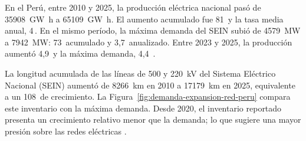 \documentclass[11pt,a4paper,oneside]{report}
\newcommand{\pct}{\mbox{\char37}}
\begin{document}
En el Perú, entre 2010 y 2025, la producción eléctrica nacional pasó de \SI{35908}{\giga\watt\hour} a \SI{65109}{\giga\watt\hour}. El aumento acumulado fue 81\,\pct{} y la tasa media anual, 4\,\pct{}. En el mismo período, la máxima demanda del SEIN subió de \SI{4579}{\mega\watt} a \SI{7942}{\mega\watt}: 73\,\pct{} acumulado y 3,7\,\pct{} anualizado. Entre 2023 y 2025, la producción aumentó 4,9\,\pct{} y la máxima demanda, 4,4\,\pct{} \parencites[sec.~10.4]{minem2025anuario2024}[cuadro~4]{minem2025indicadoresDiciembre}{coesMaximaDemanda}.

La longitud acumulada de las líneas de 500 y \SI{220}{\kilo\volt} del Sistema Eléctrico Nacional (SEIN) aumentó de \SI{8266}{\kilo\metre} en 2010 a \SI{17179}{\kilo\metre} en 2025, equivalente a un 108\,\pct{} de crecimiento. La Figura~\ref{fig:demanda-expansion-red-peru} compara este inventario con la máxima demanda. Desde 2020, el inventario reportado presenta un crecimiento relativo menor que la demanda; lo que sugiere una mayor presión sobre las redes eléctricas \parencites{coesEstadisticasAnuales}{coesMaximaDemanda}.
\end{document}
